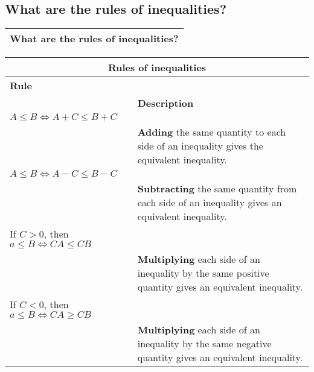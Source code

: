 \subsection{
What are the rules of inequalities?}
\begin{small}
    \begin{tabularx}{1\textwidth}{
            p{}
        }
        \toprule
        What are the rules of inequalities?
        \\
        \bottomrule
    \end{tabularx}
\end{small}
\begin{small}
    \begin{tabularx}{1\textwidth}{
            p{}
            p{}
        }
        \toprule
        \multicolumn{2}{c}{Rules of inequalities}
        \\
        \midrule

        \textbf{Rule}
        \\
        &
        \textbf{Description}
        \\
        \midrule

        $ A \leq B  \iff A + C \leq B + C $
        \\
        &
        \textbf{Adding} the same quantity to each side of an inequality gives
        the equivalent inequality.
        \\
        \midrule

        $ A \leq B  \iff A - C \leq B - C $
        \\
        &
        \textbf{Subtracting} the same quantity from each side of an inequality
        gives an equivalent inequality.
        \\
        \midrule

        If $ C > 0$, then $a \leq B \iff CA \leq CB$
        \\
        &
        \textbf{Multiplying} each side of an inequality by the same positive
        quantity gives an equivalent inequality.
        \\
        \midrule

        If $ C < 0$, then $a \leq B \iff CA \geq CB$
        \\
        &
        \textbf{Multiplying} each side of an inequality by the same negative
        quantity gives an equivalent inequality.
        \\
        \midrule


\end{tabularx}
\end{small}
